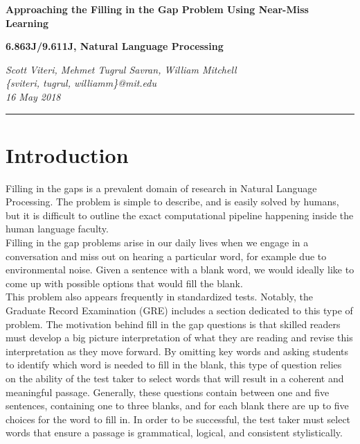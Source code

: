 \documentclass{article}[12pt]
\theoremstyle{definition}
\begin{document}
\begin{center}
{\bf \huge{Approaching the Filling in the Gap Problem Using Near-Miss Learning}}
\end{center}

\vspace{5mm}

\begin{center}
{\bf 6.863J/9.611J,  Natural Language Processing}
\end{center}

\begin{center}
\emph{Scott Viteri, Mehmet Tugrul Savran, William Mitchell}\\
\emph{\{sviteri, tugrul, williamm\}@mit.edu}\\
\emph{16 May 2018}\\
\end{center}

\hrule

\section{Introduction}

Filling in the gaps is a prevalent domain of research in Natural Language Processing. The problem is simple to describe, and is easily solved by humans, but it is difficult to outline the exact computational pipeline happening inside the human language faculty. \\

Filling in the gap problems arise in our daily lives when we engage in a conversation and miss out on hearing a particular word, for example due to environmental noise. Given a sentence with a blank word, we would ideally like to come up with possible options that would fill the blank.\\ 

This problem also appears frequently in standardized tests. Notably, the Graduate Record Examination (GRE) includes a section dedicated to this type of problem. The motivation behind fill in the gap questions is that skilled readers must develop a big picture interpretation of what they are reading and revise this interpretation as they move forward. By omitting key words and asking students to identify which word is needed to fill in the blank, this type of question relies on the ability of the test taker to select words that will result in a coherent and meaningful passage. Generally, these questions contain between one and five sentences, containing one to three blanks, and for each blank there are up to five choices for the word to fill in. In order to be successful, the test taker must select words that ensure a passage is grammatical, logical, and consistent stylistically.  \\
\end{document}
